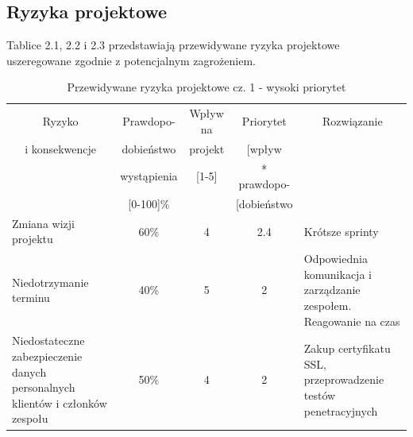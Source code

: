 \documentclass[a4paper,11pt]{article}
\begin{document}
\subsection{Ryzyka projektowe}
Tablice 2.1, 2.2 i 2.3 przedstawiają przewidywane ryzyka projektowe uszeregowane zgodnie z potencjalnym zagrożeniem.
\begin{table}[h!]
	\centering
	\caption{Przewidywane ryzyka projektowe cz. 1 - wysoki priorytet}
	\bgroup
	\begin{tabular}{|p{5cm}|c|c|c|p{5cm}|}
		
		
		\hline
		\multicolumn{1}{|c|}{Ryzyko} & \multicolumn{1}{c|}{Prawdopo-} & \multicolumn{1}{c|}{Wpływ na} & \multicolumn{1}{c|}{Priorytet } & \multicolumn{1}{c|}{Rozwiązanie} \\
		\multicolumn{1}{|c|}{i konsekwencje} & \multicolumn{1}{c|}{dobieństwo} & \multicolumn{1}{c|}{projekt} & \multicolumn{1}{c|}{[wpływ} &  \\
		\multicolumn{1}{|c|}{} & \multicolumn{1}{c|}{wystąpienia} & \multicolumn{1}{c|}{[1-5]} & \multicolumn{1}{c|}{* prawdopo-} & \multicolumn{1}{c|}{} \\
		\multicolumn{1}{|c|}{} & \multicolumn{1}{c|}{[0-100]\%} & \multicolumn{1}{c|}{} & \multicolumn{1}{c|}{[dobieństwo} &  \\ \hline \hline
		
		
		Zmiana wizji projektu & 60\% & 4 & 2.4 & Krótsze sprinty  \\ \hline
		Niedotrzymanie terminu & 40\% & 5 & 2 & Odpowiednia komunikacja i zarządzanie zespołem. Reagowanie na czas
		\\ \hline
		Niedostateczne zabezpieczenie danych personalnych klientów i członków zespołu & 50\% & 4 & 2 & Zakup certyfikatu SSL, przeprowadzenie testów penetracyjnych
		\\ \hline
		
		
		
	
		
		
	\end{tabular}
	\egroup
\end{table}
\end{document}
